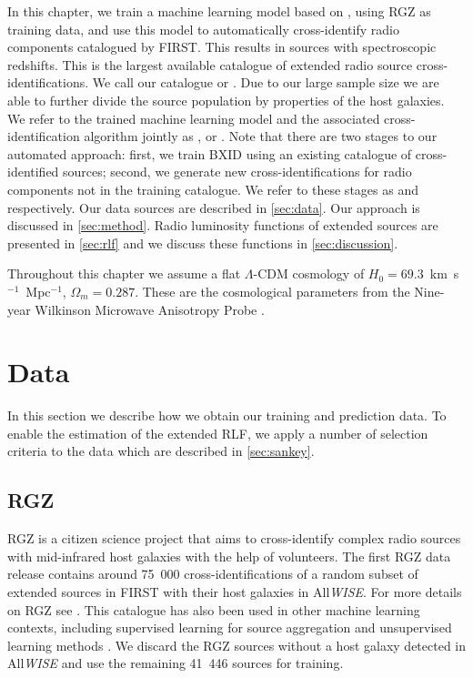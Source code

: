 In this chapter, we train a machine learning model based on \citet{alger18radio}, using RGZ as training data, and
use this model to automatically cross-identify \ncomponents{} radio components catalogued by FIRST. This results in \nsourceszsp{} sources
with spectroscopic redshifts. This is the largest available catalogue of
extended radio source cross-identifications. We call our catalogue
 or . Due to our large sample size we are able to further divide the
source population by properties of the host galaxies. We refer to the trained machine learning model and the associated cross-identification algorithm jointly as , or . Note that there are two stages to our automated approach: first, we train BXID using an existing catalogue of cross-identified sources; second, we generate new cross-identifications for radio components not in the training catalogue. We refer to these stages as  and  respectively. Our data sources are described in \autoref{sec:data}. Our approach is discussed in \autoref{sec:method}. Radio luminosity functions of extended sources are presented in \autoref{sec:rlf} and we discuss these functions in \autoref{sec:discussion}.

Throughout this chapter we assume a flat $\Lambda$-CDM cosmology of $H_0 =
69.3$~km~s$^{-1}$~Mpc$^{-1}$, $\Omega_m = 0.287$. These are the cosmological
parameters from the Nine-year Wilkinson Microwave Anisotropy Probe
\citep[WMAP9;][]{hinshaw13wmap9}.

\section{Data} \label{sec:data}

In this section we describe how we obtain our training and prediction data. To enable the estimation of the extended RLF, we apply a number of selection criteria to the data which are described in \autoref{sec:sankey}.

    \subsection{RGZ} \label{sec:rgz-data}

    RGZ is a citizen science project that aims to cross-identify complex radio sources with mid-infrared host galaxies with the help of volunteers. The first RGZ data release contains around 75~000 cross-identifications of a random subset of extended sources in FIRST with their host galaxies in All\emph{WISE}. For more details on RGZ see \citet{banfield15}. This catalogue has also been used in other machine learning contexts, including supervised learning for source aggregation \citep{wu19claran} and unsupervised learning methods \citep{galvin19som,ralph19ae}. We discard the RGZ sources without a host galaxy detected in All\emph{WISE} and use the remaining 41~446 sources for training.

